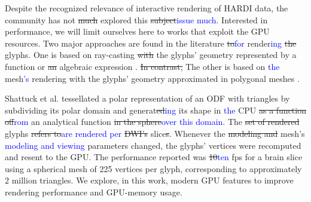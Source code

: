 \documentclass[twoside,twocolumn,10pt]{article}
\begin{document}
 Despite the recognized relevance of interactive rendering of HARDI data, the community has not \sout{much} explored this \sout{subject}\textcolor{blue}{issue much}. Interested in performance, we will limit ourselves here to works that exploit the GPU resources. Two major approaches are found in the literature \sout{to}\textcolor{blue}{for} render\textcolor{blue}{ing} \sout{the} glyphs. One is based on ray-casting \sout{with} the glyphs' geometry represented by a function or \sout{an} algebraic expression \cite{peeters2009, almsick2011}. \sout{In contrast, }The other is based on \textcolor{blue}{the} mesh\textcolor{blue}{'s} rendering with the glyphs' geometry approximated in polygonal meshes \cite{shattuck2008}.
 
 

Shattuck et al. \cite{shattuck2008} tessellated a polar representation of an ODF with triangles by subdividing its polar domain and generat\sout{ed}\textcolor{blue}{ing} its shape in \textcolor{blue}{the} CPU \sout{as a function of}\textcolor{blue}{from} an analytical function \sout{in the sphere}\textcolor{blue}{over this domain}. The \sout{set of rendered} glyphs \sout{refers to}\textcolor{blue}{are rendered per} \sout{DWI's} slice\sout{s}. Whenever the \sout{modeling and} mesh's \textcolor{blue}{modeling and viewing} parameters changed, the glyphs' vertices were recomputed and resent to the GPU. The performance reported was \sout{10}\textcolor{blue}{ten} fps for a brain slice using a spherical mesh of 225 vertices per glyph, corresponding to approximately 2 million triangles. We explore, in this work, modern GPU features to improve rendering performance and GPU-memory usage. %



\end{document}
